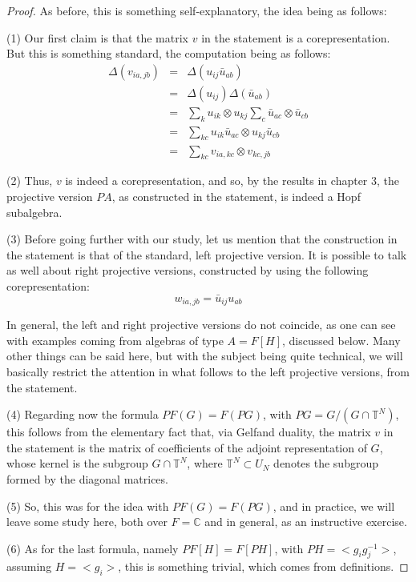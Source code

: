 \documentclass[12pt]{amsbook}
\begin{document}
\begin{proof}
As before, this is something self-explanatory, the idea being as follows:

\medskip

(1) Our first claim is that the matrix $v$ in the statement is a corepresentation. But this is something standard, the computation being as follows:
\begin{eqnarray*}
\Delta(v_{ia,jb})
&=&\Delta(u_{ij}\bar{u}_{ab})\\
&=&\Delta(u_{ij})\Delta(\bar{u}_{ab})\\
&=&\sum_ku_{ik}\otimes u_{kj}\sum_c\bar{u}_{ac}\otimes\bar{u}_{cb}\\
&=&\sum_{kc}u_{ik}\bar{u}_{ac}\otimes u_{kj}\bar{u}_{cb}\\
&=&\sum_{kc}v_{ia,kc}\otimes v_{kc,jb}
\end{eqnarray*}

(2) Thus, $v$ is indeed a corepresentation, and so, by the results in chapter 3, the projective version $PA$, as constructed in the statement, is indeed a Hopf subalgebra.

\medskip

(3) Before going further with our study, let us mention that the construction in the statement is that of the standard, left projective version. It is possible to talk as well about right projective versions, constructed by using the following corepresentation:
$$w_{ia,jb}=\bar{u}_{ij}u_{ab}$$

In general, the left and right projective versions do not coincide, as one can see with examples coming from algebras of type $A=F[H]$, discussed below. Many other things can be said here, but with the subject being quite technical, we will basically restrict the attention in what follows to the left projective versions, from the statement.

\medskip

(4) Regarding now the formula $PF(G)=F(PG)$, with $PG=G/(G\cap\mathbb T^N)$, this follows from the elementary fact that, via Gelfand duality, the matrix $v$ in the statement is the matrix of coefficients of the adjoint representation of $G$, whose kernel is the subgroup $G\cap\mathbb T^N$, where $\mathbb T^N\subset U_N$ denotes the subgroup formed by the diagonal matrices.

\medskip

(5) So, this was for the idea with $PF(G)=F(PG)$, and in practice, we will leave some study here, both over $F=\mathbb C$ and in general, as an instructive exercise.

\medskip

(6) As for the last formula, namely $PF[H]=F[PH]$, with $PH=<g_ig_j^{-1}>$, assuming $H=<g_i>$, this is something trivial, which comes from definitions.
\end{proof}
\end{document}
